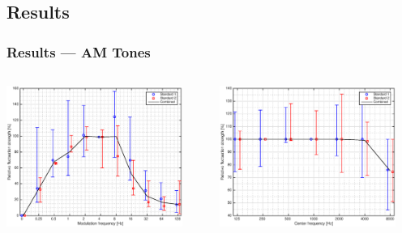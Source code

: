\documentclass{beamer}
\begin{document}
\subsection{Results}
\begin{frame}
  \frametitle{Results --- AM Tones}
  \begin{columns}
    \begin{column}{0.5\textwidth}
      \includegraphics[width=0.9\textwidth]{AM-fm_all_standards}
    \end{column}
    \begin{column}{0.5\textwidth}
      \includegraphics[width=0.9\textwidth]{AM-fc_all_standards}
    \end{column}
  \end{columns}


\end{frame}
\end{document}
